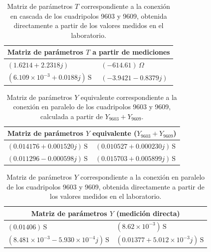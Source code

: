 \begin{table}[H]
\centering
\begin{tabular}{|l|l|}
\hline
\multicolumn{2}{|c|}{\textbf{Matriz de parámetros $T$ a partir de mediciones}} \\ \hline
$(1.6214 + 2.2318j)$ & $(-614.61)\,\Omega$ \\ \hline
$(6.109\times10^{-3} + 0.0188j)\,\mathrm{S}$ & $(-3.9421 - 0.8379j)$ \\ \hline
\end{tabular}
\caption{Matriz de parámetros $T$ correspondiente a la conexión en cascada de los cuadripolos 9603 y 9609, obtenida directamente a partir de los valores medidos en el laboratorio.}
\label{tab:matriz_T_cascada_directa}
\end{table}

\begin{table}[H]
\centering
\begin{tabular}{|l|l|}
\hline
\multicolumn{2}{|c|}{\textbf{Matriz de parámetros $Y$ equivalente ($Y_{9603} + Y_{9609}$)}} \\ \hline
$(0.014176 + 0.001520j)\,\mathrm{S}$ & $(0.010527 + 0.000230j)\,\mathrm{S}$ \\ \hline
$(0.011296 - 0.000598j)\,\mathrm{S}$ & $(0.015703 + 0.005899j)\,\mathrm{S}$ \\ \hline
\end{tabular}
\caption{Matriz de parámetros $Y$ equivalente correspondiente a la conexión en paralelo de los cuadripolos 9603 y 9609, calculada a partir de $Y_{9603} + Y_{9609}$.}
\label{tab:matriz_Y_paralelo_suma}
\end{table}

\begin{table}[H]
\centering
\begin{tabular}{|l|l|}
\hline
\multicolumn{2}{|c|}{\textbf{Matriz de parámetros $Y$ (medición directa)}} \\ \hline
$(0.01406)\,\mathrm{S}$ & $(8.62\times10^{-3})\,\mathrm{S}$ \\ \hline
$(8.481\times10^{-3} - 5.930\times10^{-4}j)\,\mathrm{S}$ & $(0.01377 + 5.012\times10^{-3}j)\,\mathrm{S}$ \\ \hline
\end{tabular}
\caption{Matriz de parámetros $Y$ correspondiente a la conexión en paralelo de los cuadripolos 9603 y 9609, obtenida directamente a partir de los valores medidos en el laboratorio.}
\label{tab:matriz_Y_paralelo_directa}
\end{table}

